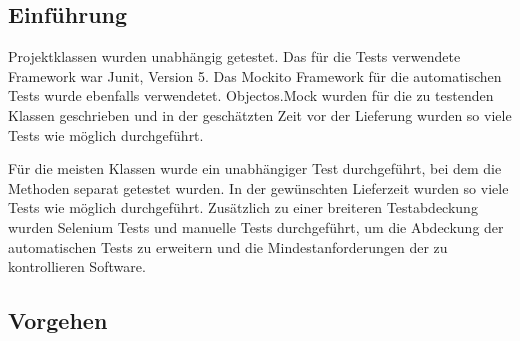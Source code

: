 \documentclass[enabledeprecatedfontcommands,fontsize=12pt,paper=a4,twoside]{scrartcl}
\begin{document}
\subsection{Einführung}

Projektklassen wurden unabhängig getestet. Das für die Tests verwendete
Framework war Junit, Version 5. Das Mockito Framework für die automatischen
Tests wurde ebenfalls verwendetet. Objectos.Mock wurden für die zu testenden
Klassen geschrieben und in der geschätzten Zeit vor der Lieferung wurden so
viele Tests wie möglich durchgeführt.

Für die meisten Klassen wurde ein unabhängiger Test durchgeführt, bei dem die
Methoden separat getestet wurden. In der gewünschten Lieferzeit wurden so viele
Tests wie möglich durchgeführt. Zusätzlich zu einer breiteren Testabdeckung
wurden Selenium Tests und manuelle Tests durchgeführt, um die Abdeckung der
automatischen Tests zu erweitern und die Mindestanforderungen der zu
kontrollieren Software.


\subsection{Vorgehen}
\end{document}

